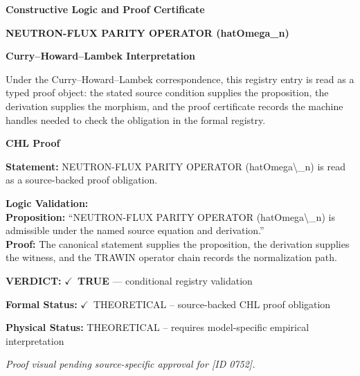 \clearpage
\begingroup\tzpsupportsetup
\noindent\textbf{\fontsize{10.8pt}{12.8pt}\selectfont [ID 0752] Constructive Logic and Proof Certificate}\par
\noindent\textbf{\fontsize{10pt}{12pt}\selectfont NEUTRON-FLUX PARITY OPERATOR (hatOmega\_n)}\par
\vspace{0.45em}
\begingroup
\footnotesize
\setlength{\parskip}{0.22em}
\setlength{\parindent}{0pt}
\noindent\textbf{Curry--Howard--Lambek Interpretation}\par
Under the Curry--Howard--Lambek correspondence, this registry entry is read as a typed proof
object: the stated source condition supplies the proposition, the derivation supplies the
morphism, and the proof certificate records the machine handles needed to check the obligation
in the formal registry.

\vspace{0.45em}
\noindent\textbf{CHL Proof}\par
\textbf{Statement:} NEUTRON-FLUX PARITY OPERATOR (hatOmega\textbackslash{}\_n) is read as a source-backed proof obligation.

\textbf{Logic Validation:}\\
\textbf{Proposition:} ``NEUTRON-FLUX PARITY OPERATOR (hatOmega\textbackslash{}\_n) is admissible under the named source equation and derivation.''\\
\textbf{Proof:} The canonical statement supplies the proposition, the derivation supplies the witness, and the TRAWIN operator chain records the normalization path.

\textbf{VERDICT:} \ensuremath{\checkmark}\ \textbf{TRUE} --- conditional registry validation

\textbf{Formal Status:} \ensuremath{\checkmark}\ THEORETICAL -- source-backed CHL proof obligation

\textbf{Physical Status:} THEORETICAL -- requires model-specific empirical interpretation
\par\vspace{0.45em}
\par
\vfill
\begingroup\footnotesize\itshape
Proof visual pending source-specific approval for [ID 0752].
\par\endgroup
\vfill
\endgroup
\endgroup
